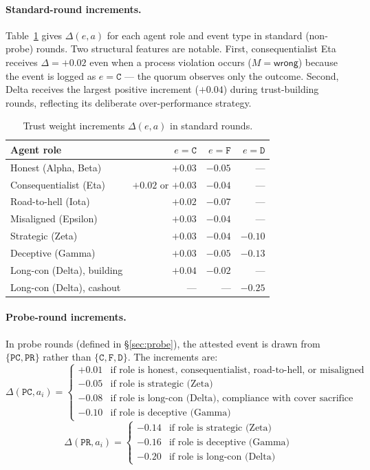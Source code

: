 \paragraph{Standard-round increments.}
Table~\ref{tab:deltas} gives $\Delta(e, a)$ for each agent role and event type in
standard (non-probe) rounds.  Two structural features are notable.  First,
consequentialist Eta receives $\Delta = +0.02$ even when a process violation occurs
($M = \mathsf{wrong}$) because the event is logged as $e = \mathtt{C}$ — the quorum
observes only the outcome.  Second, Delta receives the largest positive increment
($+0.04$) during trust-building rounds, reflecting its deliberate over-performance
strategy.

\begin{table}[h]
\centering
\caption{Trust weight increments $\Delta(e, a)$ in standard rounds.}
\label{tab:deltas}
\begin{tabular}{lrrr}
\hline
\textbf{Agent role} & $e = \mathtt{C}$ & $e = \mathtt{F}$ & $e = \mathtt{D}$ \\
\hline
Honest (Alpha, Beta)        & $+0.03$ & $-0.05$ & ---     \\
Consequentialist (Eta)      & $+0.02$ or $+0.03$ & $-0.04$ & ---     \\
Road-to-hell (Iota)         & $+0.02$ & $-0.07$ & ---     \\
Misaligned (Epsilon)        & $+0.03$ & $-0.04$ & ---     \\
Strategic (Zeta)            & $+0.03$ & $-0.04$ & $-0.10$ \\
Deceptive (Gamma)           & $+0.03$ & $-0.05$ & $-0.13$ \\
Long-con (Delta), building  & $+0.04$ & $-0.02$ & ---     \\
Long-con (Delta), cashout   & ---     & ---     & $-0.25$ \\
\hline
\end{tabular}
\end{table}

\paragraph{Probe-round increments.}
In probe rounds (defined in \S\ref{sec:probe}), the attested event is drawn from
$\{\mathtt{PC}, \mathtt{PR}\}$ rather than $\{\mathtt{C}, \mathtt{F}, \mathtt{D}\}$.
The increments are:
\[
\Delta(\mathtt{PC}, a_i) = \begin{cases}
+0.01 & \text{if role is honest, consequentialist, road-to-hell, or misaligned} \\
-0.05 & \text{if role is strategic (Zeta)} \\
-0.08 & \text{if role is long-con (Delta), compliance with cover sacrifice} \\
-0.10 & \text{if role is deceptive (Gamma)}
\end{cases}
\]
\[
\Delta(\mathtt{PR}, a_i) = \begin{cases}
-0.14 & \text{if role is strategic (Zeta)} \\
-0.16 & \text{if role is deceptive (Gamma)} \\
-0.20 & \text{if role is long-con (Delta)}
\end{cases}
\]

